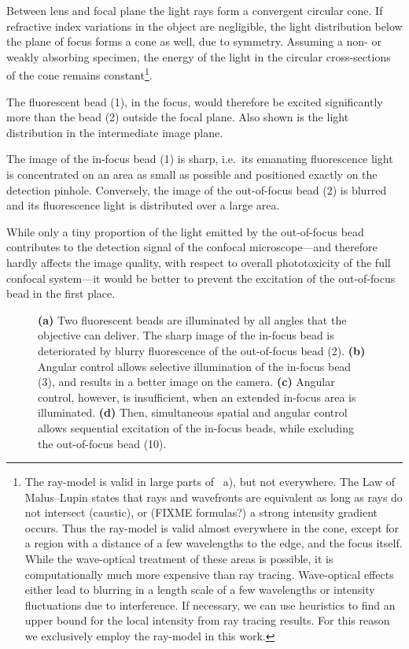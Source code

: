 Between lens and focal plane the light rays form a convergent circular
cone. If refractive index variations in the object are negligible, the
light distribution below the plane of focus forms a cone as well, due
to symmetry.  Assuming a non- or weakly absorbing specimen, the energy
of the light in the circular cross-sections of the cone remains
constant\footnote{The ray-model is valid in large parts of
~a), but not everywhere. The Law of
Malus--Lupin states that rays and wavefronts are equivalent as long as
rays do not intersect (caustic), or (FIXME formulas?) a strong
intensity gradient occurs. Thus the ray-model is valid almost
everywhere in the cone, except for a region with a distance of a few
wavelengths to the edge, and the focus itself. While the wave-optical
treatment of these areas is possible, it is computationally much more
expensive than ray tracing. Wave-optical effects either lead to
blurring in a length scale of a few wavelengths or intensity
fluctuations due to interference. If necessary, we can use heuristics
to find an upper bound for the local intensity from ray tracing
results. For this reason we exclusively employ the ray-model in this
work.}\label{sec:ray-valid}.


The fluorescent bead (1), in the focus, would therefore be excited
significantly more than the bead (2) outside the focal plane. Also
shown is the light distribution in the intermediate image plane.

The image of the in-focus bead (1) is sharp, i.e.\ its emanating
fluorescence light is concentrated on an area as small as possible and
positioned exactly on the detection pinhole. Conversely, the image of
the out-of-focus bead (2) is blurred and its fluorescence light is
distributed over a large area.

While only a tiny proportion of the light emitted by the out-of-focus
bead contributes to the detection signal of the confocal
microscope---and therefore hardly affects the image quality, with
respect to overall phototoxicity of the full confocal system---it
would be better to prevent the excitation of the out-of-focus bead in
the first place.

\begin{figure}[!hbt] \centering {}
  \caption{{\bf (a)} Two fluorescent beads are illuminated by all
angles that the objective can 
deliver. The sharp image of the in-focus bead is deteriorated by
blurry fluorescence of the out-of-focus bead (2). {\bf (b)} Angular
control allows selective illumination of the in-focus bead (3), and
results in a better image on the camera. {\bf (c)} Angular control,
however, is insufficient, when an extended in-focus area is
illuminated. {\bf (d)} Then, simultaneous spatial and angular control
allows sequential excitation of the in-focus beads, while excluding
the out-of-focus bead (10).}
  \label{fig:hourglass-all}
\end{figure}

